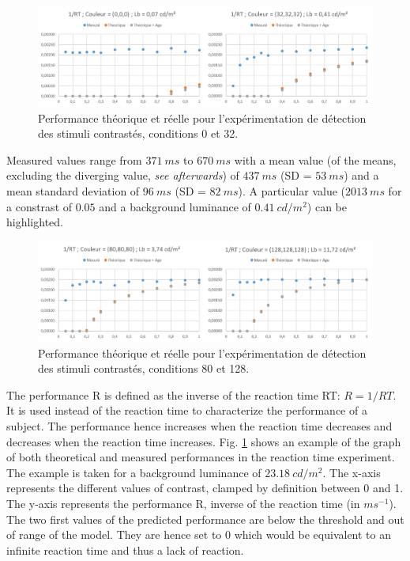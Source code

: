 	\begin{figure}
		\centering
		\includegraphics[width=\linewidth]{Figures/ResultsRVP_1}
		\caption{Performance théorique et réelle pour l'expérimentation de détection des stimuli contrastés, conditions 0 et 32.}
		\label{fig:results_rvp_1}
	\end{figure}

	\par Measured values range from $371~ms$ to $670~ms$ with a mean value (of the means, excluding the diverging value, \textit{see afterwards}) of $437~ms$ (SD = $53~ms$) and a mean standard deviation of $96~ms$ (SD = $82~ms$). A particular value ($2013~ms$ for a constrast of $0.05$ and a background luminance of $0.41~cd/m^2$) can be highlighted.

	\begin{figure}
		\centering
		\includegraphics[width=\linewidth]{Figures/ResultsRVP_2}
		\caption{Performance théorique et réelle pour l'expérimentation de détection des stimuli contrastés, conditions 80 et 128.}
		\label{fig:results_rvp_2}
	\end{figure}

	\par The performance R is defined as the inverse of the reaction time RT: $R = 1/RT$. It is used instead of the reaction time to characterize the performance of a subject. The performance hence increases when the reaction time decreases and decreases when the reaction time increases. Fig. \ref{fig:results_rvp_1} shows an example of the graph of both theoretical and measured performances in the reaction time experiment. The example is taken for a background luminance of $23.18~cd/m^2$. The x-axis represents the different values of contrast, clamped by definition between 0 and 1. The y-axis represents the performance R, inverse of the reaction time (in $ms^{-1}$). The two first values of the predicted performance are below the threshold and out of range of the model. They are hence set to 0 which would be equivalent to an infinite reaction time and thus a lack of reaction.
	
